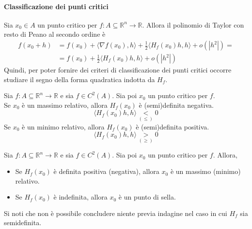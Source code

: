 \paragraph{Classificazione dei punti critici} Sia $x_0 \in A$ un punto critico per $f:A \subseteq \mathbb{R}^n\to \mathbb{R}$. Allora il polinomio di Taylor con resto di Peano al secondo ordine è
\begin{equation}
    \begin{aligned}
        f(x_0+h)&=f(x_0)+ \langle \nabla f(x_0), h\rangle+ \frac{1}{2}\langle H_f(x_0)h,h \rangle +o(|h^2|)=\\ 
        &= f(x_0)+ \frac{1}{2}\langle H_f(x_0)h,h \rangle + o(|h^2|)
    \end{aligned}
\end{equation} 
Quindi, per poter fornire dei criteri di classificazione dei punti critici occorre studiare il segno della forma quadratica indotta da $H_f$.
\begin{proposition}
    Sia $f:A \subseteq \mathbb{R}^n \to \mathbb{R}$ e sia $f \in C^2(A)$. Sia poi $x_0$ un punto critico per $f$.\\
    Se $x_0$ è un massimo relativo, allora $H_f(x_0)$ è (semi)definita negativa.
    \begin{equation}
        \langle H_f(x_0)h, h \rangle \underset{(\leq)}{<} 0
    \end{equation}
    Se $x_0$ è un minimo relativo, allora $H_f(x_0)$ è (semi)definita positiva.
    \begin{equation}
        \langle H_f(x_0)h, h \rangle \underset{(\geq)}{>} 0
    \end{equation}
\end{proposition}
\begin{theorem} \label{Teo: Condizione sufficiente del secondo ordine}
    Sia $f:A \subseteq \mathbb{R}^n \to \mathbb{R}$ e sia $f \in C^2(A)$. Sia poi $x_0$ un punto critico per $f$. Allora, 
    \begin{itemize}
        \item Se $H_f(x_0)$ è definita positiva (negativa), allora $x_0$ è un massimo (minimo) relativo.
        \item Se $H_f(x_0)$ è indefinita, allora $x_0$ è un punto di sella.
    \end{itemize}
    \begin{oss}
        Si noti che non è possibile concludere niente previa indagine nel caso in cui $H_f$ sia semidefinita.
    \end{oss}
\end{theorem}
